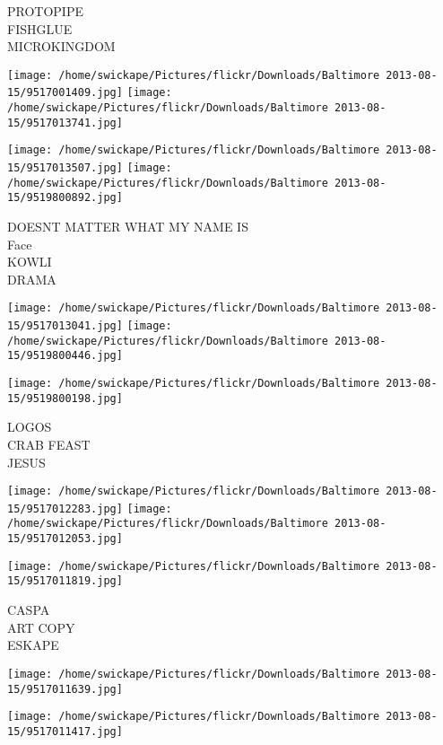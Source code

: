 \documentclass[10pt,letterpaper]{article}
\begin{document}
PROTOPIPE\\
FISHGLUE\\
MICROKINGDOM\\
\pagebreak

\texttt{[image: /home/swickape/Pictures/flickr/Downloads/Baltimore 2013-08-15/9517001409.jpg]}
\texttt{[image: /home/swickape/Pictures/flickr/Downloads/Baltimore 2013-08-15/9517013741.jpg]}

\texttt{[image: /home/swickape/Pictures/flickr/Downloads/Baltimore 2013-08-15/9517013507.jpg]}
\texttt{[image: /home/swickape/Pictures/flickr/Downloads/Baltimore 2013-08-15/9519800892.jpg]}

DOESNT MATTER WHAT MY NAME IS\\
Face\\
KOWLI\\
DRAMA\\
\pagebreak

\texttt{[image: /home/swickape/Pictures/flickr/Downloads/Baltimore 2013-08-15/9517013041.jpg]}
\texttt{[image: /home/swickape/Pictures/flickr/Downloads/Baltimore 2013-08-15/9519800446.jpg]}

\vspace{0.25in}
\texttt{[image: /home/swickape/Pictures/flickr/Downloads/Baltimore 2013-08-15/9519800198.jpg]}

LOGOS\\
CRAB FEAST\\
JESUS\\
\pagebreak

\texttt{[image: /home/swickape/Pictures/flickr/Downloads/Baltimore 2013-08-15/9517012283.jpg]}
\texttt{[image: /home/swickape/Pictures/flickr/Downloads/Baltimore 2013-08-15/9517012053.jpg]}

\texttt{[image: /home/swickape/Pictures/flickr/Downloads/Baltimore 2013-08-15/9517011819.jpg]}

CASPA\\
ART COPY\\
ESKAPE\\
\pagebreak

\texttt{[image: /home/swickape/Pictures/flickr/Downloads/Baltimore 2013-08-15/9517011639.jpg]}

\vspace{0.25in}
\texttt{[image: /home/swickape/Pictures/flickr/Downloads/Baltimore 2013-08-15/9517011417.jpg]}
\end{document}

